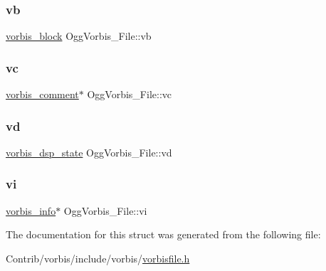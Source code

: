 \mbox{\label{struct_ogg_vorbis___file_a3201599977a781b7bf559167cd892638}} 
\subsubsection{\texorpdfstring{vb}{vb}}
{\footnotesize\ttfamily \mbox{\hyperlink{structvorbis__block}{vorbis\+\_\+block}} Ogg\+Vorbis\+\_\+\+File\+::vb}

\mbox{\label{struct_ogg_vorbis___file_a4467850c72aed93fe0a70e8f1fd6f20e}} 
\subsubsection{\texorpdfstring{vc}{vc}}
{\footnotesize\ttfamily \mbox{\hyperlink{structvorbis__comment}{vorbis\+\_\+comment}}$\ast$ Ogg\+Vorbis\+\_\+\+File\+::vc}

\mbox{\label{struct_ogg_vorbis___file_acb9d38719f54642d1a39f24203b466d6}} 
\subsubsection{\texorpdfstring{vd}{vd}}
{\footnotesize\ttfamily \mbox{\hyperlink{structvorbis__dsp__state}{vorbis\+\_\+dsp\+\_\+state}} Ogg\+Vorbis\+\_\+\+File\+::vd}

\mbox{\label{struct_ogg_vorbis___file_aa5586b939d7c31c8eec83cf1380b45a6}} 
\subsubsection{\texorpdfstring{vi}{vi}}
{\footnotesize\ttfamily \mbox{\hyperlink{structvorbis__info}{vorbis\+\_\+info}}$\ast$ Ogg\+Vorbis\+\_\+\+File\+::vi}



The documentation for this struct was generated from the following file\+:\begin{DoxyCompactItemize}
\item 
Contrib/vorbis/include/vorbis/\mbox{\hyperlink{vorbisfile_8h}{vorbisfile.\+h}}\end{DoxyCompactItemize}
